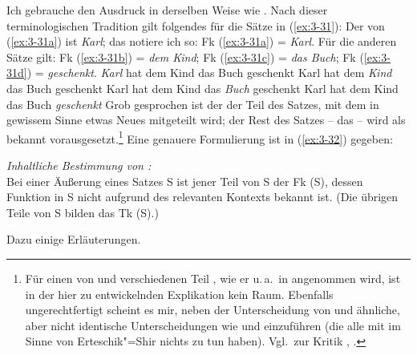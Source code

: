 \documentclass[output=paper]{langsci/langscibook}
\begin{document}
Ich gebrauche den Ausdruck  in derselben Weise wie
\citet{Chomsky76a}. Nach dieser terminologischen Tradition gilt folgendes für die Sätze in (\ref{ex:3-31}): Der  von (\ref{ex:3-31a}) ist \textit{Karl}; das notiere ich so: Fk (\ref{ex:3-31a}) = \textit{Karl}. Für die anderen Sätze gilt: Fk (\ref{ex:3-31b}) = \textit{dem Kind}; Fk (\ref{ex:3-31c}) = \textit{das Buch}; Fk (\ref{ex:3-31d}) = \textit{geschenkt}.
\eal \label{ex:3-31}
\ex
\label{ex:3-31a}
\textit{Karl} hat dem Kind das Buch geschenkt
\ex
\label{ex:3-31b}
Karl hat dem \textit{Kind} das Buch geschenkt
\ex
\label{ex:3-31c}
Karl hat dem Kind das \textit{Buch} geschenkt
\ex
\label{ex:3-31d}
Karl hat dem Kind das Buch \textit{geschenkt}
\zl
Grob gesprochen ist der  der Teil des Satzes, mit dem in gewissem
Sinne etwas Neues mitgeteilt wird; der Rest des Satzes -- das
 -- wird als bekannt vorausgesetzt.\footnote{\label{fn:3-8}%
  Für einen von  und  verschiedenen Teil , wie er u.\,a.\ \zb in
  \citet{Sgall73} angenommen wird, ist in der hier zu entwickelnden Explikation kein Raum. Ebenfalls
  ungerechtfertigt scheint es mir, neben der Unterscheidung von  und  ähnliche, aber nicht
  identische Unterscheidungen wie  und  einzuführen (die alle mit  im Sinne von Erteschik"=Shir
  nichts zu tun haben). Vgl.\ zur Kritik \citet{Pasch78b,Pasch78a}, \citet{Sgall77}.%
}
Eine genauere Formulierung ist in (\ref{ex:3-32}) gegeben:
\begin{exe}
\ex \label{ex:3-32}
\textit{Inhaltliche Bestimmung von :} \\
Bei einer Äußerung eines Satzes S ist jener Teil von S der
 Fk (S), dessen Funktion in S nicht aufgrund des relevanten Kontexts bekannt ist. (Die übrigen Teile von S bilden das  Tk (S).)
\end{exe}
Dazu einige Erläuterungen.
\end{document}
